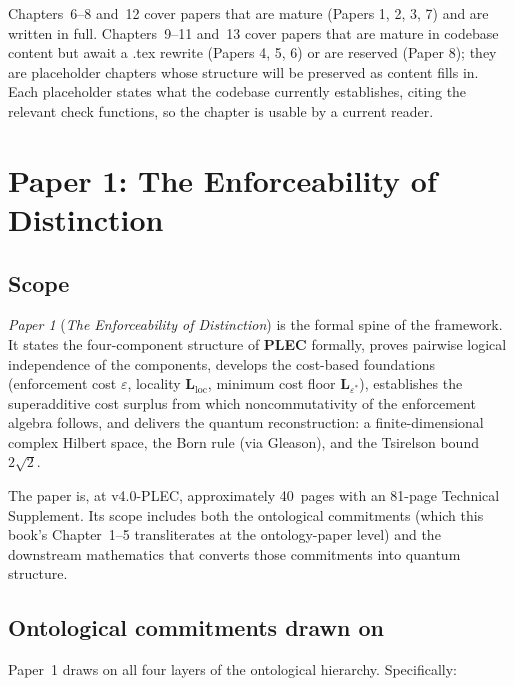 \documentclass[11pt]{article}
\newcommand{\paperref}[2]{\emph{Paper #1} (\emph{#2})}
\newcommand{\PLEC}{\textbf{PLEC}}
\begin{document}
\noindent Chapters~6--8 and~12 cover papers that are mature (Papers 1, 2, 3, 7) and are written in full. Chapters~9--11 and~13 cover papers that are mature in codebase content but await a .tex rewrite (Papers 4, 5, 6) or are reserved (Paper 8); they are placeholder chapters whose structure will be preserved as content fills in. Each placeholder states what the codebase currently establishes, citing the relevant check functions, so the chapter is usable by a current reader.

\section{Paper 1: The Enforceability of Distinction}\label{sec:P1}

\subsection{Scope}\label{sec:P1_scope}

\paperref{1}{The Enforceability of Distinction} is the formal spine of the framework. It states the four-component structure of \PLEC{} formally, proves pairwise logical independence of the components, develops the cost-based foundations (enforcement cost $\varepsilon$, locality \textbf{L}$_{\mathrm{loc}}$, minimum cost floor \textbf{L}$_{\varepsilon^*}$), establishes the superadditive cost surplus from which noncommutativity of the enforcement algebra follows, and delivers the quantum reconstruction: a finite-dimensional complex Hilbert space, the Born rule (via Gleason), and the Tsirelson bound $2\sqrt{2}$.

The paper is, at v4.0-PLEC, approximately 40~pages with an 81-page Technical Supplement. Its scope includes both the ontological commitments (which this book's Chapter~1--5 transliterates at the ontology-paper level) and the downstream mathematics that converts those commitments into quantum structure.

\subsection{Ontological commitments drawn on}\label{sec:P1_commitments}

Paper~1 draws on all four layers of the ontological hierarchy. Specifically:
\end{document}
